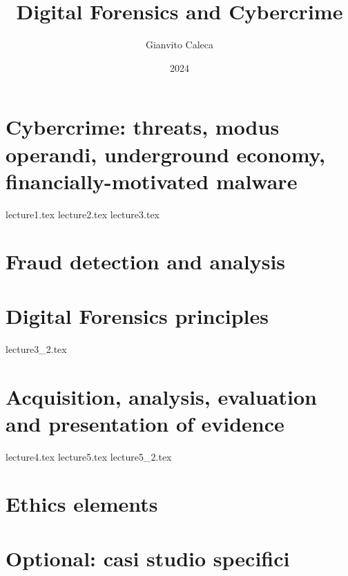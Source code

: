 \documentclass{report}
\title{Digital Forensics and Cybercrime}
\date{2024}
\author{Gianvito Caleca}
\begin{document}
\maketitle
\tableofcontents
\part{Cybercrime: threats, modus operandi, underground economy, financially-motivated malware}
{lecture1.tex}
{lecture2.tex}
{lecture3.tex}
\part{Fraud detection and analysis}
\part{Digital Forensics principles}
{lecture3_2.tex}
\part{Acquisition, analysis, evaluation and presentation of evidence}
{lecture4.tex}
{lecture5.tex}
{lecture5_2.tex}
\part{Ethics elements}
\part{Optional: casi studio specifici}
\end{document}
